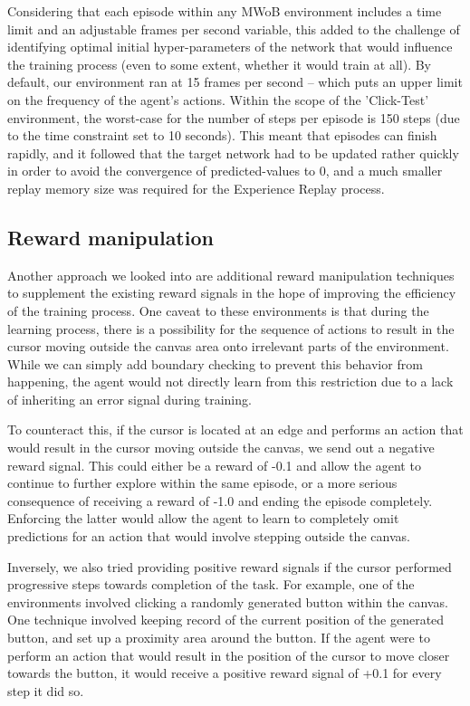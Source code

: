 \documentclass[10pt,journal,compsoc]{IEEEtran}
\begin{document}
Considering that each episode within any MWoB environment includes a time limit and an adjustable frames per second variable, this added to the challenge of identifying optimal initial hyper-parameters of the network that would influence the training process (even to some extent, whether it would train at all). By default, our environment ran at 15 frames per second  -- which puts an upper limit on the frequency of the agent's actions. Within the scope of the 'Click-Test' environment, the worst-case for the number of steps per episode is 150 steps (due to the time constraint set to 10 seconds). This meant that episodes can finish rapidly, and it followed that the target network had to be updated rather quickly in order to avoid the convergence of predicted-values to 0, and a much smaller replay memory size was required for the Experience Replay process.

\subsection{Reward manipulation}
Another approach we looked into are additional reward manipulation techniques to supplement the existing reward signals in the hope of improving the efficiency of the training process. One caveat to these environments is that during the learning process, there is a possibility for the sequence of actions to result in the cursor moving outside the canvas area onto irrelevant parts of the environment. While we can simply add boundary checking to prevent this behavior from happening, the agent would not directly learn from this restriction due to a lack of inheriting an error signal during training. \linebreak

To counteract this, if the cursor is located at an edge and performs an action that would result in the cursor moving outside the canvas, we send out a negative reward signal. This could either be a reward of -0.1 and allow the agent to continue to further explore within the same episode, or a more serious consequence of receiving a reward of -1.0 and ending the episode completely. Enforcing the latter would allow the agent to learn to completely omit predictions for an action that would involve stepping outside the canvas. \linebreak

Inversely, we also tried providing positive reward signals if the cursor performed progressive steps towards completion of the task. For example, one of the environments involved clicking a randomly generated button within the canvas. One technique involved keeping record of the current position of the generated button, and set up a proximity area around the button. If the agent were to perform an action that would result in the position of the cursor to move closer towards the button, it would receive a positive reward signal of +0.1 for every step it did so.
\end{document}
